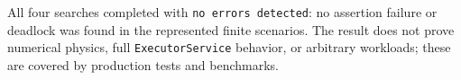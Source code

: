 All four searches completed with \texttt{no errors detected}: no assertion
failure or deadlock was found in the represented finite scenarios. The result
does not prove numerical physics, full \texttt{ExecutorService} behavior, or
arbitrary workloads; these are covered by production tests and benchmarks.
